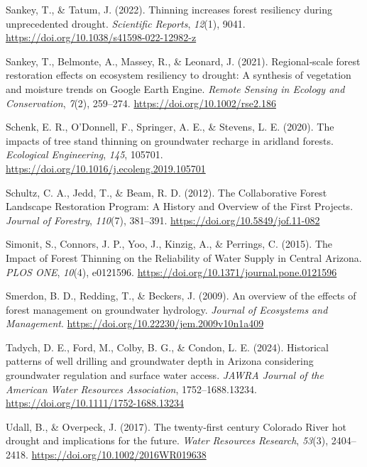\documentclass[
]{agujournal2019}
\newlength{\cslhangindent}
\newenvironment{CSLReferences}[2] %
 {\begin{list}{}{%
  \setlength{\itemindent}{0pt}
  \setlength{\leftmargin}{0pt}
  \setlength{\parsep}{0pt}
  \ifodd #1
   \setlength{\leftmargin}{\cslhangindent}
   \setlength{\itemindent}{-1\cslhangindent}
  \fi
  \setlength{\itemsep}{#2\baselineskip}}}
 {\end{list}}
\begin{document}
\begin{CSLReferences}{1}{0}
Sankey, T., \& Tatum, J. (2022). Thinning increases forest resiliency
during unprecedented drought. \emph{Scientific Reports}, \emph{12}(1),
9041. \url{https://doi.org/10.1038/s41598-022-12982-z}

Sankey, T., Belmonte, A., Massey, R., \& Leonard, J. (2021).
Regional‐scale forest restoration effects on ecosystem resiliency to
drought: A synthesis of vegetation and moisture trends on {Google}
{Earth} {Engine}. \emph{Remote Sensing in Ecology and Conservation},
\emph{7}(2), 259--274. \url{https://doi.org/10.1002/rse2.186}

Schenk, E. R., O'Donnell, F., Springer, A. E., \& Stevens, L. E. (2020).
The impacts of tree stand thinning on groundwater recharge in aridland
forests. \emph{Ecological Engineering}, \emph{145}, 105701.
\url{https://doi.org/10.1016/j.ecoleng.2019.105701}

Schultz, C. A., Jedd, T., \& Beam, R. D. (2012). The {Collaborative}
{Forest} {Landscape} {Restoration} {Program}: {A} {History} and
{Overview} of the {First} {Projects}. \emph{Journal of Forestry},
\emph{110}(7), 381--391. \url{https://doi.org/10.5849/jof.11-082}

Simonit, S., Connors, J. P., Yoo, J., Kinzig, A., \& Perrings, C.
(2015). The {Impact} of {Forest} {Thinning} on the {Reliability} of
{Water} {Supply} in {Central} {Arizona}. \emph{PLOS ONE}, \emph{10}(4),
e0121596. \url{https://doi.org/10.1371/journal.pone.0121596}

Smerdon, B. D., Redding, T., \& Beckers, J. (2009). An overview of the
effects of forest management on groundwater hydrology. \emph{Journal of
Ecosystems and Management}.
\url{https://doi.org/10.22230/jem.2009v10n1a409}

Tadych, D. E., Ford, M., Colby, B. G., \& Condon, L. E. (2024).
Historical patterns of well drilling and groundwater depth in {Arizona}
considering groundwater regulation and surface water access. \emph{JAWRA
Journal of the American Water Resources Association}, 1752--1688.13234.
\url{https://doi.org/10.1111/1752-1688.13234}

Udall, B., \& Overpeck, J. (2017). The twenty‐first century {Colorado}
{River} hot drought and implications for the future. \emph{Water
Resources Research}, \emph{53}(3), 2404--2418.
\url{https://doi.org/10.1002/2016WR019638}


\end{CSLReferences}
\end{document}
